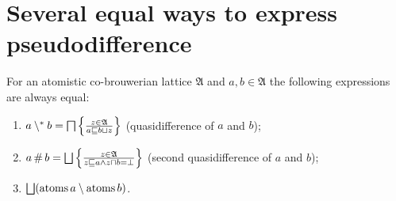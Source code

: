 \section{Several equal ways to express pseudodifference}
\begin{thm}
\label{pdiff-eq1}For an atomistic co-brouwerian lattice $\mathfrak{A}$
and $a,b\in\mathfrak{A}$ the following expressions are always equal:
\begin{enumerate}
\item \label{pdiff-pdiff}$a\setminus^{\ast} b=\bigsqcap\left\{ \frac{z\in\mathfrak{A}}{a\sqsubseteq b\sqcup z}\right\}$
(quasidifference of $a$ and $b$);
\item \label{pdiff-sec}$a\mathop\#b=\bigsqcup\left\{ \frac{z\in\mathfrak{A}}{z\sqsubseteq a\land z\sqcap b=\bot}\right\}$
(second quasidifference of $a$ and $b$);
\item \label{pdiff-atm}$\bigsqcup(\operatorname{atoms} a\setminus\operatorname{atoms} b)$.
\end{enumerate}
\end{thm}
